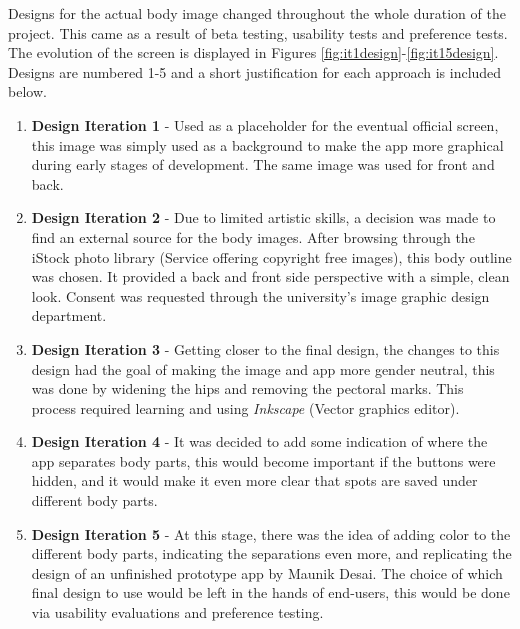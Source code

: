 Designs for the actual body image changed throughout the whole duration of the project. This came as a result of beta testing, usability tests and preference tests. The evolution of the screen is displayed in Figures \ref{fig:it1design}-\ref{fig:it15design}. Designs are numbered 1-5 and a short justification for each approach is included below.
\begin{enumerate}
    \item \textbf{Design Iteration 1} - Used as a placeholder for the eventual official screen, this image was simply used as a background to make the app more graphical during early stages of development. The same image was used for front and back.
    \item \textbf{Design Iteration 2} - Due to limited artistic skills, a decision was made to find an external source for the body images. After browsing through the iStock photo library (Service offering copyright free images), this body outline was chosen. It provided a back and front side perspective with a simple, clean look. Consent was requested through the university's image graphic design department.
    \item \textbf{Design Iteration 3} - Getting closer to the final design, the changes to this design had the goal of making the image and app more gender neutral, this was done by widening the hips and removing the pectoral marks. This process required learning and using \emph{Inkscape} (Vector graphics editor).
    \item \textbf{Design Iteration 4} - It was decided to add some indication of where the app separates body parts, this would become important if the buttons were hidden, and it would make it even more clear that spots are saved under different body parts.
    \item \textbf{Design Iteration 5} - At this stage, there was the idea of adding color to the different body parts, indicating the separations even more, and replicating the design of an unfinished prototype app by Maunik Desai. The choice of which final design to use would be left in the hands of end-users, this would be done via usability evaluations and preference testing.
\end{enumerate}

